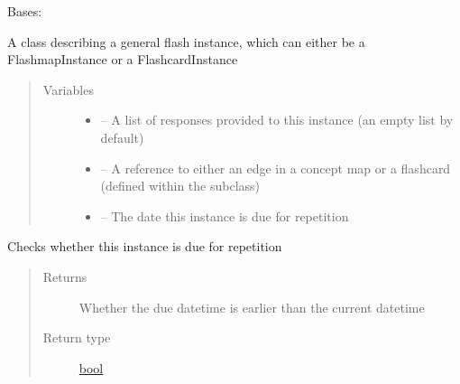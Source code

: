 \documentclass[letterpaper,10pt,english]{sphinxmanual}
\begin{document}
\begin{fulllineitems}
\label{\detokenize{instance:instance.Instance}}
Bases: 

A class describing a general flash instance, which can either be a FlashmapInstance or a FlashcardInstance
\begin{quote}\begin{description}
\item[{Variables}] \leavevmode\begin{itemize}
\item {} 
 -- A list of responses provided to this instance (an empty list by default)

\item {} 
 -- A reference to either an edge in a concept map or a flashcard (defined within the subclass)

\item {} 
 -- The date this instance is due for repetition

\end{itemize}

\end{description}\end{quote}

\begin{fulllineitems}
\label{\detokenize{instance:instance.Instance.check_due}}
Checks whether this instance is due for repetition
\begin{quote}\begin{description}
\item[{Returns}] \leavevmode
Whether the due datetime is earlier than the current datetime

\item[{Return type}] \leavevmode
\href{https://docs.python.org/2/library/functions.html\#bool}{bool}

\end{description}\end{quote}

\end{fulllineitems}



\end{fulllineitems}
\end{document}
